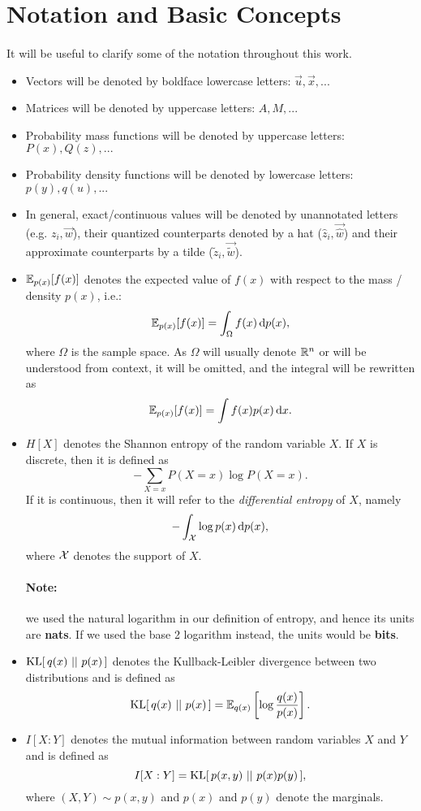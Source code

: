 \section{Notation and Basic Concepts}
\paragraph{}
It will be useful to clarify some of the notation throughout this work.
\begin{itemize}
\item Vectors will be denoted by boldface lowercase letters: $\vec{u}, \vec{x}, ...$
\item Matrices will be denoted by uppercase letters: $A, M, ...$
\item Probability mass functions will be denoted by uppercase letters: $P(x),
  Q(z), ...$
\item Probability density functions will be denoted by lowercase letters: $p(y),
  q(u), ...$
\item In general, exact/continuous values will be denoted by unannotated letters
  (e.g. $z_i, \vec{w}$), their quantized counterparts denoted by a hat
  ($\hat{z}_i, \vec{\hat{w}}$) and their approximate counterparts by a tilde
  ($\tilde{z}_i, \vec{\tilde{w}}$).
\item $\mathbb{E}_{p(x)}[f(x)]$ denotes the expected value of $f(x)$ with respect to
  the mass / density $p(x)$, i.e.:
  \[
    \mathbb{E}_{p(x)}[f(x)] = \int_\Omega f(x) \,\text{d} p(x),
  \]
  where $\Omega$ is the sample space. As $\Omega$ will usually denote $\mathbb{R}^n$
  or will be understood from context, it will be omitted, and the integral will
  be rewritten as
  \[
    \mathbb{E}_{p(x)}[f(x)] = \int f(x)p(x) \,\text{d} x.
  \]
\item $H[X]$ denotes the Shannon entropy of the random variable $X$. If $X$ is
  discrete, then it is defined as
  \[
    -\sum_{X=x}P(X=x)\log P(X=x).
  \]
  If it is continuous, then it will refer to the \textit{differential entropy}
  of $X$, namely
  \[
    -\int_{\mathcal{X}}\log p(x) \,\text{d} p(x),
  \]
  where $\mathcal{X}$ denotes the support of $X$.
  \paragraph{Note:} we used the natural logarithm in our definition of entropy,
  and hence its units are \textbf{nats}. If we used the base 2 logarithm
  instead, the units would be \textbf{bits}.
\item $\mathrm{KL}[\,q(x)\,\,||\,\,p(x)\,]$ denotes the Kullback-Leibler divergence between two
  distributions and is defined as
  \[
    \mathrm{KL}[\,q(x)\,\,||\,\,p(x)\,] = \mathbb{E}_{q(x)}\left[\log\frac{q(x)}{p(x)}\right].
  \]
\item $I[X : Y]$ denotes the mutual information between random variables $X$ and
  $Y$ and is defined as
  \[
    I[X : Y] = \mathrm{KL}[\,p(x, y)\,\,||\,\,p(x)p(y)\,],
  \]
  where $(X, Y) \sim p(x, y)$ and $p(x)$ and $p(y)$ denote the marginals.
\end{itemize}
